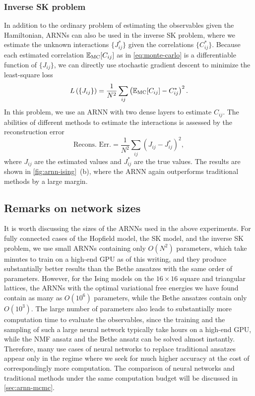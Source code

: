 \subsubsection{Inverse SK problem}

In addition to the ordinary problem of estimating the observables given the Hamiltonian, ARNNs can also be used in the inverse SK problem, where we estimate the unknown interactions $\{J^*_{i j}\}$ given the correlations $\{C^*_{i j}\}$. Because each estimated correlation $\mathbb{E}_\text{MC}[C_{i j}]$ as in \cref{eq:monte-carlo} is a differentiable function of $\{J_{i j}\}$, we can directly use stochastic gradient descent to minimize the least-square loss
\begin{equation}
L\left( \{J_{i j}\} \right) = \frac{1}{N^2} \sum_{i j} \left( \mathbb{E}_\text{MC}[C_{i j}] - C^*_{i j} \right)^2.
\end{equation}
In this problem, we use an ARNN with two dense layers to estimate $C_{i j}$. The abilities of different methods to estimate the interactions is assessed by the reconstruction error
\begin{equation}
\text{Recons. Err.} = \frac{1}{N^2} \sum_{i j} \left( J_{i j} - J^*_{i j} \right)^2,
\end{equation}
where $J_{i j}$ are the estimated values and $J^*_{i j}$ are the true values. The results are shown in \cref{fig:arnn-ising}~(b), where the ARNN again outperforms traditional methods by a large margin.

\subsection{Remarks on network sizes}

It is worth discussing the sizes of the ARNNs used in the above experiments. For fully connected cases of the Hopfield model, the SK model, and the inverse SK problem, we use small ARNNs containing only $O(N^2)$ parameters, which take minutes to train on a high-end GPU as of this writing, and they produce substantially better results than the Bethe ansatzes with the same order of parameters. However, for the Ising models on the $16 \times 16$ square and triangular lattices, the ARNNs with the optimal variational free energies we have found contain as many as $O(10^6)$ parameters, while the Bethe ansatzes contain only $O(10^3)$. The large number of parameters also leads to substantially more computation time to evaluate the observables, since the training and the sampling of such a large neural network typically take hours on a high-end GPU, while the NMF ansatz and the Bethe ansatz can be solved almost instantly. Therefore, many use cases of neural networks to replace traditional ansatzes appear only in the regime where we seek for much higher accuracy at the cost of correspondingly more computation. The comparison of neural networks and traditional methods under the same computation budget will be discussed in \cref{sec:arnn-mcmc}.

